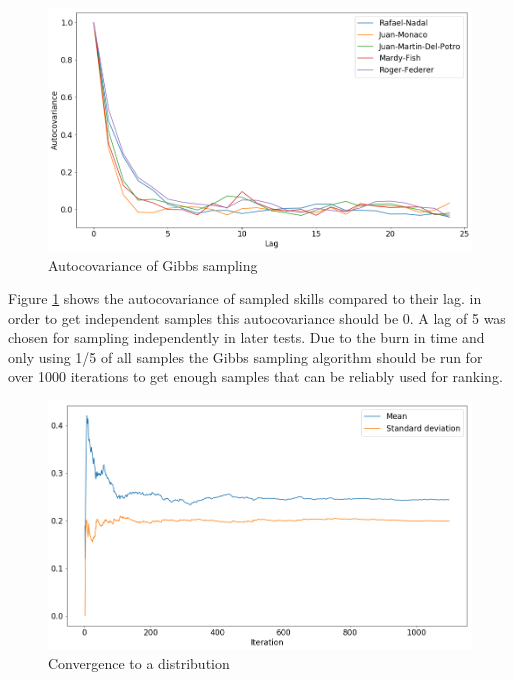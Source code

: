 \documentclass[twoside,twocolumn]{article}
\begin{document}
\begin{figure}[h]
  \centering
    \includegraphics[width=\linewidth]{a_2}
  \caption{Autocovariance of Gibbs sampling}
  \label{fig:a_2}
\end{figure}
Figure \ref{fig:a_2} shows the autocovariance of sampled skills compared to their lag. in order to get independent samples this autocovariance should be 0. A lag of 5 was chosen for sampling independently in later tests. Due to the burn in time and only using 1/5 of all samples the Gibbs sampling algorithm should be run for over 1000 iterations to get enough samples that can be reliably used for ranking.

\begin{figure}[h]
  \centering
    \includegraphics[width=\linewidth]{a_3}
  \caption{Convergence to a distribution}
  \label{fig:a_3}
\end{figure}
\end{document}
